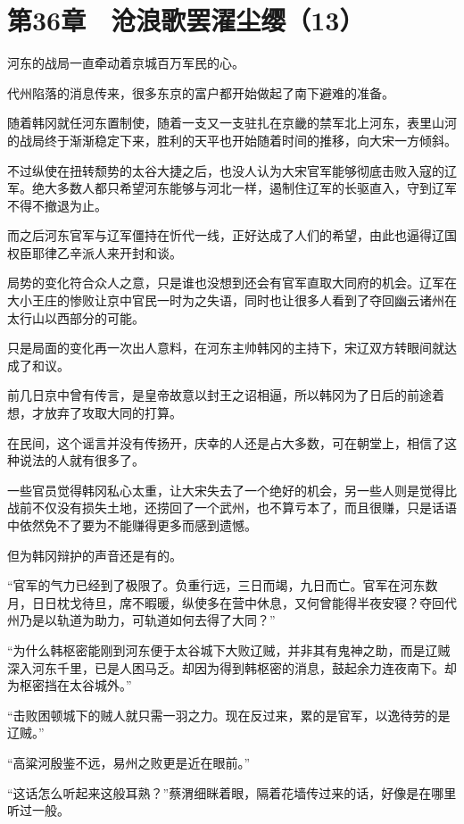 \section{第36章　沧浪歌罢濯尘缨（13）}

河东的战局一直牵动着京城百万军民的心。

代州陷落的消息传来，很多东京的富户都开始做起了南下避难的准备。

随着韩冈就任河东置制使，随着一支又一支驻扎在京畿的禁军北上河东，表里山河的战局终于渐渐稳定下来，胜利的天平也开始随着时间的推移，向大宋一方倾斜。

不过纵使在扭转颓势的太谷大捷之后，也没人认为大宋官军能够彻底击败入寇的辽军。绝大多数人都只希望河东能够与河北一样，遏制住辽军的长驱直入，守到辽军不得不撤退为止。

而之后河东官军与辽军僵持在忻代一线，正好达成了人们的希望，由此也逼得辽国权臣耶律乙辛派人来开封和谈。

局势的变化符合众人之意，只是谁也没想到还会有官军直取大同府的机会。辽军在大小王庄的惨败让京中官民一时为之失语，同时也让很多人看到了夺回幽云诸州在太行山以西部分的可能。

只是局面的变化再一次出人意料，在河东主帅韩冈的主持下，宋辽双方转眼间就达成了和议。

前几日京中曾有传言，是皇帝故意以封王之诏相逼，所以韩冈为了日后的前途着想，才放弃了攻取大同的打算。

在民间，这个谣言并没有传扬开，庆幸的人还是占大多数，可在朝堂上，相信了这种说法的人就有很多了。

一些官员觉得韩冈私心太重，让大宋失去了一个绝好的机会，另一些人则是觉得比战前不仅没有损失土地，还捞回了一个武州，也不算亏本了，而且很赚，只是话语中依然免不了要为不能赚得更多而感到遗憾。

但为韩冈辩护的声音还是有的。

“官军的气力已经到了极限了。负重行远，三日而竭，九日而亡。官军在河东数月，日日枕戈待旦，席不暇暖，纵使多在营中休息，又何曾能得半夜安寝？夺回代州乃是以轨道为助力，可轨道如何去得了大同？”

“为什么韩枢密能刚到河东便于太谷城下大败辽贼，并非其有鬼神之助，而是辽贼深入河东千里，已是人困马乏。却因为得到韩枢密的消息，鼓起余力连夜南下。却为枢密挡在太谷城外。”

“击败困顿城下的贼人就只需一羽之力。现在反过来，累的是官军，以逸待劳的是辽贼。”

“高粱河殷鉴不远，易州之败更是近在眼前。”

“这话怎么听起来这般耳熟？”蔡渭细眯着眼，隔着花墙传过来的话，好像是在哪里听过一般。

